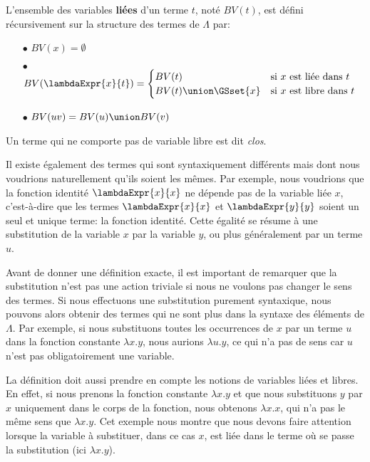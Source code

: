 \begin{definition} 
  L'ensemble des variables \textbf{liées} d'un terme $t$, noté $BV(t)$, est défini
  récursivement sur la structure des termes de $\Lambda$ par:
  \begin{itemize}
  \item[$\bullet$] $BV(x) = \emptyset$
  \item[$\bullet$] $BV(\lambdaExpr{x}{t}) = \begin{cases}
      BV(t)                  & \text{si}\ x\ \text{est liée dans}\ t \\
      BV(t) \union \GSset{x} & \text{si}\ x\ \text{est libre dans}\ t
    \end{cases}$
  \item[$\bullet$] $BV(u v) = BV(u) \union BV(v)$
  \end{itemize}
\end{definition}

Un terme qui ne comporte pas de variable libre est dit \textit{clos}.

Il existe également des termes qui sont syntaxiquement différents mais dont nous
voudrions naturellement qu'ils soient les mêmes. Par exemple, nous voudrions que
la fonction identité $\lambdaExpr{x}{x}$ ne dépende pas de la variable liée $x$,
c'est-à-dire que les termes $\lambdaExpr{x}{x}$ et $\lambdaExpr{y}{y}$ soient un seul et
unique terme: la fonction identité. Cette égalité se résume à une substitution
de la variable $x$ par la variable $y$, ou plus généralement par un terme $u$.

Avant de donner une définition exacte, il est important de remarquer que la
substitution n'est pas une action triviale si nous ne voulons pas changer le
sens des termes. Si nous effectuons une
substitution purement syntaxique, nous pouvons alors obtenir des termes qui ne sont
plus dans la syntaxe des éléments de $\Lambda$. Par exemple, si nous
substituons toutes les occurrences de $x$ par un terme $u$ dans la fonction constante
$\lambda x . y$, nous aurions $\lambda u . y$, ce qui n'a pas de sens car $u$ n'est
pas obligatoirement une variable.

La définition doit aussi prendre en compte les notions de variables liées et libres. En effet, si nous
prenons la fonction constante $\lambda x . y$ et que nous substituons $y$ par 
$x$ uniquement dans le corps de la fonction, nous obtenons $\lambda x . x$, qui
n'a pas le même sens que $\lambda x . y$. Cet exemple nous montre que nous
devons faire attention lorsque la variable à substituer, dans ce cas $x$, est
liée dans le terme où se passe la substitution (ici $\lambda x . y$).


